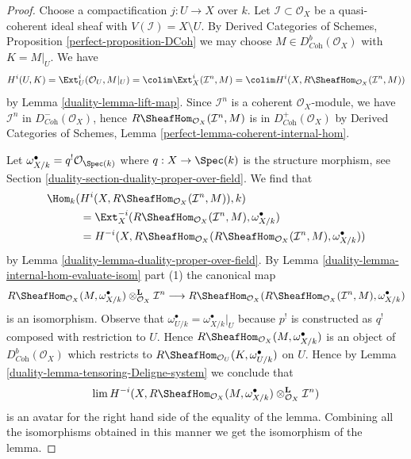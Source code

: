 \begin{proof}

Choose a compactification $j : U \to X$ over $k$. Let
$\mathcal{I} \subset \mathcal{O}_X$ be a quasi-coherent ideal
sheaf with $V(\mathcal{I}) = X \setminus U$.
By Derived Categories of Schemes, Proposition \ref{perfect-proposition-DCoh}
we may choose $M \in D^b_{\textit{Coh}}(\mathcal{O}_X)$
with $K = M|_U$. We have
$$
H^i(U, K) =
\Ext^i_U(\mathcal{O}_U, M|_U) =
\colim \Ext^i_X(\mathcal{I}^n, M) =
\colim H^i(X, R\SheafHom_{\mathcal{O}_X}(\mathcal{I}^n, M))
$$
by Lemma \ref{duality-lemma-lift-map}.
Since $\mathcal{I}^n$ is a coherent $\mathcal{O}_X$-module,
we have $\mathcal{I}^n$ in $D^-_{\textit{Coh}}(\mathcal{O}_X)$,
hence $R\SheafHom_{\mathcal{O}_X}(\mathcal{I}^n, M)$ is in
$D^+_{\textit{Coh}}(\mathcal{O}_X)$ by
Derived Categories of Schemes, Lemma
\ref{perfect-lemma-coherent-internal-hom}.

\medskip\noindent
Let $\omega_{X/k}^\bullet = q^!\mathcal{O}_{\Spec(k)}$ where
$q : X \to \Spec(k)$ is the structure morphism, see
Section \ref{duality-section-duality-proper-over-field}. We find that
\begin{align*}
\Hom_k(
&
H^i(X, R\SheafHom_{\mathcal{O}_X}(\mathcal{I}^n, M)), k) \\
& =
\Ext^{-i}_X(R\SheafHom_{\mathcal{O}_X}(\mathcal{I}^n, M),
\omega_{X/k}^\bullet) \\
& =
H^{-i}(X, R\SheafHom_{\mathcal{O}_X}(R\SheafHom_{\mathcal{O}_X}(
\mathcal{I}^n, M), \omega_{X/k}^\bullet))
\end{align*}
by Lemma \ref{duality-lemma-duality-proper-over-field}. By
Lemma \ref{duality-lemma-internal-hom-evaluate-isom} part (1) the canonical map
$$
R\SheafHom_{\mathcal{O}_X}(M, \omega_{X/k}^\bullet)
\otimes_{\mathcal{O}_X}^\mathbf{L} \mathcal{I}^n
\longrightarrow
R\SheafHom_{\mathcal{O}_X}(R\SheafHom_{\mathcal{O}_X}(
\mathcal{I}^n, M), \omega_{X/k}^\bullet)
$$
is an isomorphism. Observe that
$\omega^\bullet_{U/k} = \omega^\bullet_{X/k}|_U$
because $p^!$ is constructed as $q^!$ composed with restriction to $U$.
Hence $R\SheafHom_{\mathcal{O}_X}(M, \omega_{X/k}^\bullet)$ is
an object of $D^b_{\textit{Coh}}(\mathcal{O}_X)$ which restricts
to $R\SheafHom_{\mathcal{O}_U}(K, \omega_{U/k}^\bullet)$ on $U$.
Hence by Lemma \ref{duality-lemma-tensoring-Deligne-system} we conclude that
$$
\lim H^{-i}(X, R\SheafHom_{\mathcal{O}_X}(M, \omega_{X/k}^\bullet)
\otimes_{\mathcal{O}_X}^\mathbf{L} \mathcal{I}^n)
$$
is an avatar for the right hand side of the equality of the lemma.
Combining all the isomorphisms obtained in this manner we get
the isomorphism of the lemma.
\end{proof}

